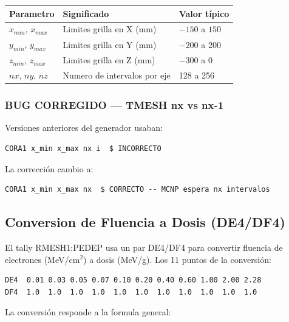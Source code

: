 \documentclass[12pt,a4paper]{article}
\begin{document}
\begin{center}
\begin{tabular}{lll}
\toprule
\textbf{Parametro} & \textbf{Significado} & \textbf{Valor típico} \\
\midrule
$x_{min}$, $x_{max}$ & Limites grilla en X (mm) & $-150$ a $150$ \\
$y_{min}$, $y_{max}$ & Limites grilla en Y (mm) & $-200$ a $200$ \\
$z_{min}$, $z_{max}$ & Limites grilla en Z (mm) & $-300$ a $0$ \\
$nx$, $ny$, $nz$ & Numero de intervalos por eje & 128 a 256 \\
\bottomrule
\end{tabular}
\end{center}

\subsubsection{BUG CORREGIDO --- TMESH nx vs nx-1}

Versiones anteriores del generador usaban:

\begin{lstlisting}
CORA1 x_min x_max nx i  $ INCORRECTO
\end{lstlisting}

La corrección cambio a:

\begin{lstlisting}
CORA1 x_min x_max nx  $ CORRECTO -- MCNP espera nx intervalos
\end{lstlisting}

\subsection{Conversion de Fluencia a Dosis (DE4/DF4)}

El tally RMESH1:PEDEP usa un par DE4/DF4 para convertir fluencia de electrones (MeV/cm$^2$) a dosis (MeV/g). Los 11 puntos de la conversión:

\begin{lstlisting}
DE4  0.01 0.03 0.05 0.07 0.10 0.20 0.40 0.60 1.00 2.00 2.28
DF4  1.0  1.0  1.0  1.0  1.0  1.0  1.0  1.0  1.0  1.0  1.0
\end{lstlisting}


La conversión responde a la formula general:
\end{document}
